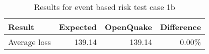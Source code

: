 \begin{table}[htbp]

\centering
\begin{tabular}{ l r r r }

\hline
\rowcolor{anti-flashwhite}
\bf{Result} & \bf{Expected} & \bf{OpenQuake} & \bf{Difference}\\
\hline
Average loss & 139.14 & 139.14 & 0.00\% \\
\hline
\end{tabular}

\caption{Results for event based risk test case 1b}
\label{tab:result-ebr-1b}
\end{table}